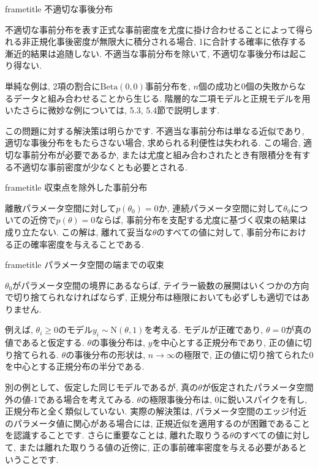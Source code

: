 \documentclass[10pt,dvipdfmx,a4]{beamer}
\newcommand{\dbox}[1]{\begin{beamercolorbox}[wd=122mm, sep=0pt, shadow=false, rounded=false]{frametitle} { #1}\end{beamercolorbox}}
\begin{document}

\begin{frame}
\dbox{不適切な事後分布}
不適切な事前分布を表す正式な事前密度を尤度に掛け合わせることによって得られる非正規化事後密度が無限大に積分される場合, 1に合計する確率に依存する漸近的結果は追随しない.
不適当な事前分布を除いて, 不適切な事後分布は起こり得ない.

単純な例は, 2項の割合に$\text{Beta}(0, 0)$事前分布を, $n$個の成功と0個の失敗からなるデータと組み合わせることから生じる.
階層的な二項モデルと正規モデルを用いたさらに微妙な例については, 5.3, 5.4節で説明します.

この問題に対する解決策は明らかです.
不適当な事前分布は単なる近似であり, 適切な事後分布をもたらさない場合, 求められる利便性は失われる.
この場合, 適切な事前分布が必要であるか, または尤度と組み合わされたとき有限積分を有する不適切な事前密度が少なくとも必要とされる.

\dbox{収束点を除外した事前分布}
離散パラメータ空間に対して$p(\theta_0)=0$か, 連続パラメータ空間に対して$\theta_0$についての近傍で$p(\theta)=0$ならば, 事前分布を支配する尤度に基づく収束の結果は成り立たない.
この解は, 離れて妥当な$\theta$のすべての値に対して, 事前分布における正の確率密度を与えることである.
\end{frame}


\begin{frame}
\dbox{パラメータ空間の端までの収束}
$\theta_0$がパラメータ空間の境界にあるならば, テイラー級数の展開はいくつかの方向で切り捨てられなければならず, 正規分布は極限においても必ずしも適切ではありません.

例えば, $\theta_i\geq 0$のモデル$y_i\sim \text{N}(\theta,1)$を考える.
モデルが正確であり, $\theta=0$が真の値であると仮定する.
$\theta$の事後分布は, $y$を中心とする正規分布であり, 正の値に切り捨てられる.
$\theta$の事後分布の形状は, $n\rightarrow \infty$の極限で, 正の値に切り捨てられた0を中心とする正規分布の半分である.

別の例として、仮定した同じモデルであるが, 真の$\theta$が仮定されたパラメータ空間外の値-1である場合を考えてみる.
$\theta$の極限事後分布は, 0に鋭いスパイクを有し, 正規分布と全く類似していない.
実際の解決策は, パラメータ空間のエッジ付近のパラメータ値に関心がある場合には, 正規近似を適用するのが困難であることを認識することです.
さらに重要なことは, 離れた取りうる$\theta$のすべての値に対して, または離れた取りうる値の近傍に, 正の事前確率密度を与える必要があるということです.
\end{frame}
\end{document}
